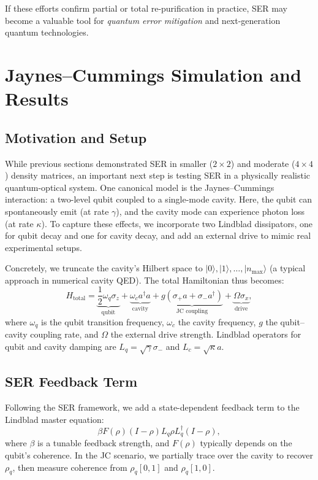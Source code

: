 \documentclass[12pt]{article}
\begin{document}
If these efforts confirm partial or total re-purification in practice, SER may become a valuable tool for \emph{quantum error mitigation} and next-generation quantum technologies.

\section{Jaynes--Cummings Simulation and Results}

\subsection{Motivation and Setup}
While previous sections demonstrated SER in smaller ($2\times 2$) and moderate ($4\times 4$) density matrices, an important next step is testing SER in a physically realistic quantum-optical system. One canonical model is the Jaynes--Cummings interaction: a two-level qubit coupled to a single-mode cavity. Here, the qubit can spontaneously emit (at rate $\gamma$), and the cavity mode can experience photon loss (at rate $\kappa$). To capture these effects, we incorporate two Lindblad dissipators, one for qubit decay and one for cavity decay, and add an external drive to mimic real experimental setups.

Concretely, we truncate the cavity’s Hilbert space to $\lvert 0 \rangle, \lvert 1 \rangle, \dots, \lvert n_{\text{max}} \rangle$ (a typical approach in numerical cavity QED). The total Hamiltonian thus becomes:
\[
H_{\text{total}} = \underbrace{\frac{1}{2} \omega_q \sigma_z}_{\text{qubit}} + \underbrace{\omega_c a^\dagger a}_{\text{cavity}} + \underbrace{g (\sigma_+ a + \sigma_- a^\dagger)}_{\text{JC coupling}} + \underbrace{\Omega \sigma_x}_{\text{drive}},
\]
where $\omega_q$ is the qubit transition frequency, $\omega_c$ the cavity frequency, $g$ the qubit--cavity coupling rate, and $\Omega$ the external drive strength. Lindblad operators for qubit and cavity damping are $L_q = \sqrt{\gamma} \sigma_-$ and $L_c = \sqrt{\kappa} a$.

\subsection{SER Feedback Term}
Following the SER framework, we add a state-dependent feedback term to the Lindblad master equation:
\[
\beta F(\rho) (I - \rho) L_q \rho L_q^\dagger (I - \rho),
\]
where $\beta$ is a tunable feedback strength, and $F(\rho)$ typically depends on the qubit’s coherence. In the JC scenario, we partially trace over the cavity to recover $\rho_q$, then measure coherence from $\rho_q[0,1]$ and $\rho_q[1,0]$.
\end{document}
